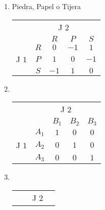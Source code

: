 \documentclass[11pt]{article}
\begin{document}
\begin{flushleft}
\begin{flushleft}
\begin{enumerate}[label=\roman*)]
\begin{center}
\begin{tabular}{cc|c|c|}
                & $A_2$ & $-c$ & $c$ \\\cline{3-4}
            \end{tabular}
        \end{center}
        \item Piedra, Papel o Tijera\\
        \begin{center}    
            \setlength{\extrarowheight}{0pt}
            \begin{tabular}{cc|c|c|c|}
                & \multicolumn{1}{c}{} & \multicolumn{2}{c}{J $2$}\\
                & \multicolumn{1}{c}{} & \multicolumn{1}{c}{$R$}  & \multicolumn{1}{c}{$P$} & \multicolumn{1}{c}{$S$} \\\cline{3-5}
                & $R$ & $0$ & $-1$ & $1$ \\\cline{3-5}
                {J $1$} & $P$ & $1$ & $0$ & $-1$ \\\cline{3-5}
                & $S$ & $-1$ & $1$ & $0$ \\\cline{3-5}
            \end{tabular}
        \end{center}
        \item ~\\
        \begin{center}    
            \setlength{\extrarowheight}{0pt}
            \begin{tabular}{cc|c|c|c|}
                & \multicolumn{1}{c}{} & \multicolumn{2}{c}{J $2$}\\
                & \multicolumn{1}{c}{} & \multicolumn{1}{c}{$B_1$}  & \multicolumn{1}{c}{$B_2$} & \multicolumn{1}{c}{$B_3$} \\\cline{3-5}
                & $A_1$ & $1$ & $0$ & $0$ \\\cline{3-5}
                {J $1$} & $A_2$ & $0$ & $1$ & $0$ \\\cline{3-5}
                & $A_3$ & $0$ & $0$ & $1$ \\\cline{3-5}
            \end{tabular}
        \end{center}
        \item ~\\
        \begin{center}    
            \setlength{\extrarowheight}{0pt}
            \begin{tabular}{cc|c|c|c|}
                & \multicolumn{1}{c}{} & \multicolumn{2}{c}{J $2$}\\

\end{tabular}
\end{center}
\end{enumerate}
\end{flushleft}
\end{flushleft}
\end{document}
